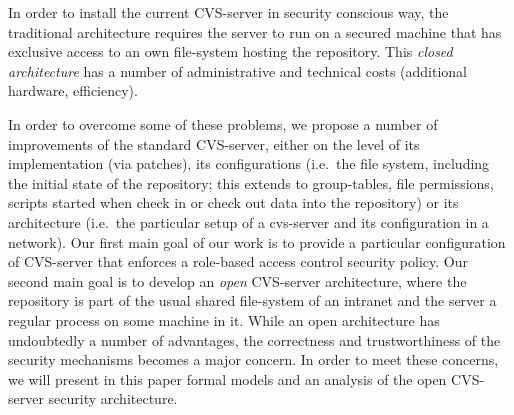 In order to install the current CVS-server in security conscious way,
the traditional architecture requires the server to run on a
secured machine that has exclusive access to an own file-system
hosting the repository. This \emph{closed architecture} has a number
of administrative and technical costs (additional hardware,
efficiency).

In order to overcome some of these problems, we propose a number of improvements
of the standard CVS-server, either on the level of its implementation (via
patches), its configurations (i.e.\ the file system, including the initial state
of the repository; this extends to group-tables, file permissions, scripts
started when check in or check out data into the repository) or its architecture
(i.e.\ the particular setup of a cvs-server and its configuration in a network).
Our first main goal of our work is to provide a particular configuration of
CVS-server that enforces a role-based access control security policy. Our second
main goal is to develop an \emph{open} CVS-server architecture, where the
repository is part of the usual shared file-system of an intranet and the server
a regular process on some machine in it. While an open architecture has
undoubtedly a number of advantages, the correctness and trustworthiness of the
security mechanisms becomes a major concern.  In order to meet these concerns,
we will present in this paper formal models and an analysis of the open
CVS-server security architecture.


